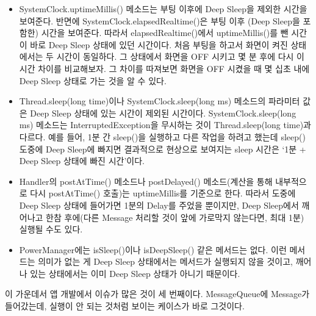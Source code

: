 \begin{itemize}
\item SystemClock.uptimeMillis() 메소드는 부팅 이후에 Deep Sleep을 제외한 시간을 보여준다. 반면에 SystemClock.elapsedRealtime()은 부팅 이후 (Deep Sleep을 포함한) 시간을 보여준다. 
따라서 elapsedRealtime()에서 uptimeMillis()를 뺀 시간이 바로 Deep Sleep 상태에 있던 시간이다. 처음 부팅을 하고서 화면이 켜진 상태에서는 두 시간이 동일하다. 그 상태에서 화면을 OFF 시키고 몇 분 후에 다시 이 시간 차이를 비교해보자. 그 차이를 따져보면 화면을 OFF 시켰을 때 몇 십초 내에 Deep Sleep 상태로 가는 것을 알 수 있다.

\item Thread.sleep(long time)이나 SystemClock.sleep(long ms) 메소드의 파라미터 값은 Deep Sleep 상태에 있는 시간이 제외된 시간이다. SystemClock.sleep(long ms) 메소드는 InterruptedException을 무시하는 것이 Thread.sleep(long time)과 다르다. 예를 들어, 1분 간 sleep()을 실행하고 다른 작업을 하려고 했는데 sleep() 도중에 Deep Sleep에 빠지면 결과적으로 현상으로 보여지는 sleep 시간은 `1분 + Deep Sleep 상태에 빠진 시간'이다. 

\item Handler의 postAtTime() 메소드나 postDelayed() 메소드(계산을 통해 내부적으로 다시 postAtTime() 호출)는 uptimeMillis를 기준으로 한다. 따라서 도중에 Deep Sleep 상태에 들어가면 1분의 Delay를 주었을 뿐이지만, Deep Sleep에서 깨어나고 한참 후에(다른 Message 처리할 것이 앞에 가로막지 않는다면, 최대 1분) 실행될 수도 있다.
\item PowerManager에는 isSleep()이나 isDeepSleep() 같은 메서드는 없다. 이런 메서드는 의미가 없는 게 Deep Sleep 상태에서는 메서드가 실행되지 않을 것이고, 깨어나 있는 상태에서는 이미 Deep Sleep 상태가 아니기 때문이다.
\end{itemize}

이 가운데서 앱 개발에서 이슈가 많은 것이 세 번째이다. 
MessageQueue에 Message가 들어갔는데, 실행이 안 되는 것처럼 보이는 케이스가 바로 그것이다.\\

